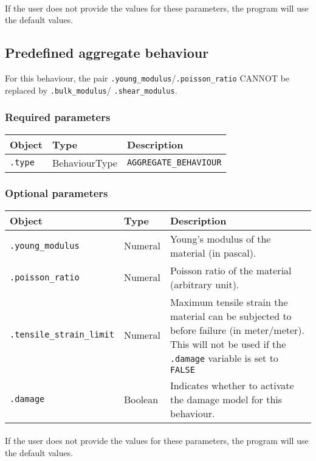 \documentclass[10pt]{article}
\begin{document}
\paragraph{} If the user does not provide the values for these parameters, the program will use the default values.

\subsection{Predefined aggregate behaviour}

For this behaviour, the pair \verb+.young_modulus+/\verb+.poisson_ratio+ CANNOT be replaced by \verb+.bulk_modulus+/ \verb+.shear_modulus+.

\subsubsection*{Required parameters}

\begin{tabularx}{\textwidth}{llX}
\hline 
Object & Type & Description \\ 
\hline 
\verb+.type+ & BehaviourType & \verb+AGGREGATE_BEHAVIOUR+ \\ 
\hline 
\end{tabularx}

\subsubsection*{Optional parameters}

\begin{tabularx}{\textwidth}{llX}
\hline 
Object & Type & Description \\ 
\hline 
\verb+.young_modulus+ & Numeral & Young's modulus of the material (in pascal). \\ 
\verb+.poisson_ratio+ & Numeral & Poisson ratio of the material (arbitrary unit). \\ 
\verb+.tensile_strain_limit+ & Numeral & Maximum tensile strain the material can be subjected to before failure (in meter/meter). This will not be used if the \verb+.damage+ variable is set to \verb+FALSE+\\
\verb+.damage+ & Boolean & Indicates whether to activate the damage model for this behaviour. \\
\hline 
\end{tabularx}

\paragraph{} If the user does not provide the values for these parameters, the program will use the default values.
\end{document}
